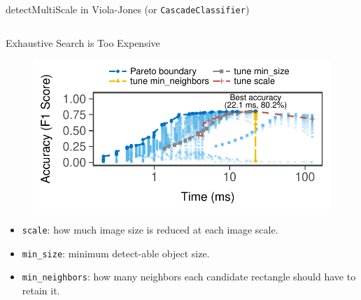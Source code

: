 \begin{frame}[t]{detectMultiScale in Viola-Jones (or
    \texttt{CascadeClassifier})}
\begin{columns}[t]
  \end{columns}
\end{frame}

\begin{frame}{Exhaustive Search is Too Expensive}
  \vspace{1em}
  \begin{figure}
    \centering
    \includegraphics[width=0.8\linewidth]{figures/serving-eval-exhaustive.pdf}
  \end{figure}

  \begin{itemize}
  \item \texttt{scale}: how much image size is reduced at each image scale.
  \item \texttt{min\_size}: minimum detect-able object size.
  \item \texttt{min\_neighbors}: how many neighbors each candidate rectangle
    should have to retain it.
  \end{itemize}
\end{frame}

